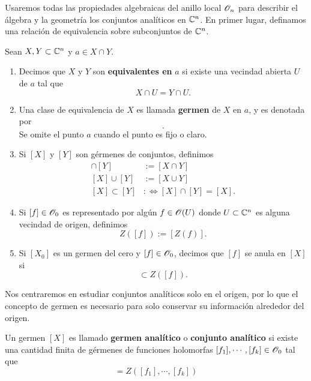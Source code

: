 Usaremos todas las propiedades algebraicas del anillo local $\mathscr{O}_n$ para describir el álgebra y la geometría los conjuntos analíticos en $\mathbb{C}^n$. En primer lugar, definamos una relación de equivalencia sobre subconjuntos de $\mathbb{C}^n$.
\begin{definition}
	Sean $X,Y\subset \mathbb{C}^n$ y $a\in X\cap Y$.
	\begin{enumerate}
		\item Decimos  que $X$ y $Y$ son \textbf{equivalentes en} $a$ si existe una vecindad abierta $U$ de $a$ tal que
		\begin{equation*}
			X\cap U = Y\cap U.
		\end{equation*}
		\item Una clase de equivalencia de $X$ es  llamada \textbf{germen} de $X$ en $a$, y es denotada por
		\begin{equation*}
			[X_a].
		\end{equation*}
		Se omite el punto $a$ cuando el punto es fijo o claro.
		\item Si $[X]$ y $[Y]$ son gérmenes de conjuntos, definimos
		\begin{align*}
			[X]\cap[Y]&:=[X\cap Y]\\
			[X]\cup[Y]&:=[X\cup Y]\\
			[X]\subset[Y]&:\Longleftrightarrow [X]\cap[Y]=[X].
		\end{align*}
		\item Si $[f]\in\mathscr{O}_0$ es representado por algún $f\in\mathscr{O}(U)$ donde $U\subset\mathbb{C}^n$ es alguna vecindad de origen, definimos
		\begin{equation}
			Z([f]):=[Z(f)].
		\end{equation}
		\item [5. ]Si $[X_0]$ es un germen del cero y $[f]\in\mathscr{O}_0$, decimos que $[f]$ se anula en $[X]$ si
		\begin{equation*}
			[X]\subset Z([f]).
		\end{equation*}
	\end{enumerate}
\end{definition}

Nos centraremos en estudiar conjuntos analíticos solo en el origen, por lo que el concepto de germen es necesario para solo conservar su información alrededor del origen.

\begin{definition}
	Un germen $[X]$ es llamado \textbf{germen analítico} o \textbf{conjunto analítico} si existe una cantidad finita de gérmenes de funciones holomorfas $[f_1],\cdots,[f_k]\in\mathscr{O}_0$ tal que
	\begin{equation*}
		[X]=Z([f_1],\cdots,[f_k])
	\end{equation*}
\end{definition}

